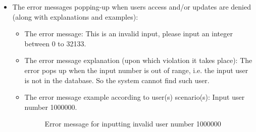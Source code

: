 \begin{itemize}
\item{}
	The error messages popping-up when users access and/or updates are denied (along with explanations and examples):
	\begin{itemize} 
	\item{The error message: This is an invalid input, please input an integer between 0 to 32133. }
	\item{The error message explanation (upon which violation it takes place):  }
	The error pops up when the input number is out of range, i.e. the input user is not in the database. So the system cannot find such user.
	\item{The error message example according to user(s) scenario(s): Input user number 1000000.}
	\begin{figure}[h] 
	\begin{center}
		\advance\rightskip-1cm
		{}
	\end{center}
	\end{figure}
	\begin{figure}[h] 
	\begin{center}
		\advance\rightskip-1cm
		{}
		\caption{Error message for inputting invalid user number 1000000}\label{fig:UI_Error}
	\end{center}
	\end{figure}
	

\end{itemize}
\end{itemize}

